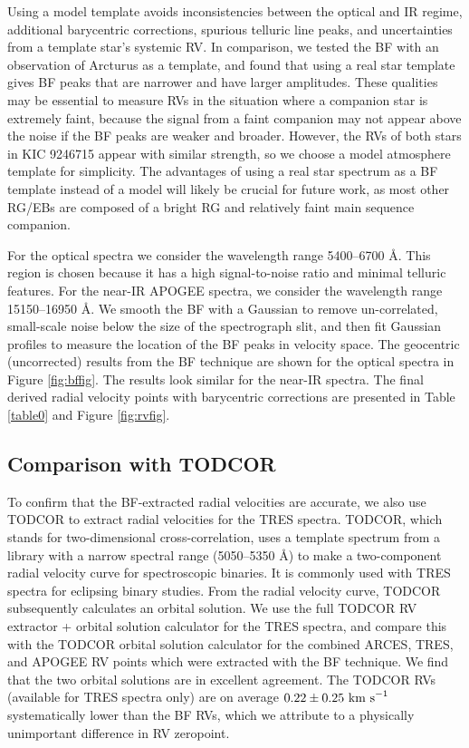 Using a model template avoids inconsistencies between the optical and IR regime, additional barycentric corrections, spurious telluric line peaks, and uncertainties from a template star's systemic RV. In comparison, we tested the BF with an observation of Arcturus as a template, and found that using a real star template gives BF peaks that are narrower and have larger amplitudes. These qualities may be essential to measure RVs in the situation where a companion star is extremely faint, because the signal from a faint companion may not appear above the noise if the BF peaks are weaker and broader. However, the RVs of both stars in KIC 9246715 appear with similar strength, so we choose a model atmosphere template for simplicity. The advantages of using a real star spectrum as a BF template instead of a model will likely be crucial for future work, as most other RG/EBs are composed of a bright RG and relatively faint main sequence companion.

For the optical spectra we consider the wavelength range 5400--6700 \AA. This region is chosen because it has a high signal-to-noise ratio and minimal telluric features. For the near-IR APOGEE spectra, we consider the wavelength range 15150--16950 \AA. We smooth the BF with a Gaussian to remove un-correlated, small-scale noise below the size of the spectrograph slit, and then fit Gaussian profiles to measure the location of the BF peaks in velocity space. The geocentric (uncorrected) results from the BF technique are shown for the optical spectra in Figure \ref{fig:bffig}. The results look similar for the near-IR spectra. The final derived radial velocity points with barycentric corrections are presented in Table \ref{table0} and Figure \ref{fig:rvfig}.

\subsection{Comparison with TODCOR}\label{todcor}
To confirm that the BF-extracted radial velocities are accurate, we also use TODCOR \citep{zuc94} to extract radial velocities for the TRES spectra. TODCOR, which stands for two-dimensional cross-correlation, uses a template spectrum from a library with a narrow spectral range (5050--5350 \AA) to make a two-component radial velocity curve for spectroscopic binaries. It is commonly used with TRES spectra for eclipsing binary studies. From the radial velocity curve, TODCOR subsequently calculates an orbital solution. We use the full TODCOR RV extractor + orbital solution calculator for the TRES spectra, and compare this with the TODCOR orbital solution calculator for the combined ARCES, TRES, and APOGEE RV points which were extracted with the BF technique. We find that the two orbital solutions are in excellent agreement. The TODCOR RVs (available for TRES spectra only) are on average $0.22 \pm 0.25 \ \rm{km \ s}^{-1}$ systematically lower than the BF RVs, which we attribute to a physically unimportant difference in RV zeropoint.
 
  
  
  